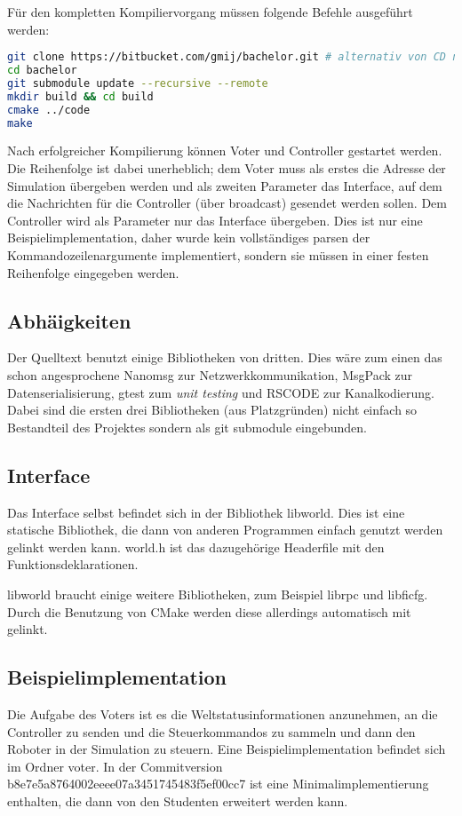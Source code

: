\documentclass[
    12pt,
    bibliography=totoc,
    ngerman,
    enabledeprecatedfontcommands
]{scrartcl}
\begin{document}
F{\"{u}}r den kompletten Kompiliervorgang m{\"{u}}ssen folgende Befehle ausgef{\"{u}}hrt werden:
\begin{lstlisting}[frame=single, language=Bash] 
git clone https://bitbucket.com/gmij/bachelor.git # alternativ von CD nehmen
cd bachelor
git submodule update --recursive --remote
mkdir build && cd build
cmake ../code
make
\end{lstlisting}

Nach erfolgreicher Kompilierung k{\"{o}}nnen Voter und Controller gestartet werden. Die Reihenfolge ist dabei unerheblich; dem Voter muss als erstes die Adresse der Simulation
{\"{u}}bergeben werden und als zweiten Parameter das Interface, auf dem die Nachrichten f{\"{u}}r die Controller ({\"{u}}ber broadcast) gesendet werden sollen. Dem Controller
wird als Parameter nur das Interface {\"{u}}bergeben. Dies ist nur eine Beispielimplementation, daher wurde kein vollst{\"{a}}ndiges parsen der Kommandozeilenargumente
implementiert, sondern sie m{\"{u}}ssen in einer festen Reihenfolge eingegeben werden.

\subsection{Abh{\"{a}}igkeiten}
Der Quelltext benutzt einige Bibliotheken von dritten. Dies w{\"{a}}re zum einen das schon angesprochene Nanomsg zur Netzwerkkommunikation, MsgPack zur Datenserialisierung,
gtest zum \textit{unit testing} und RSCODE zur Kanalkodierung. Dabei sind die ersten drei Bibliotheken (aus Platzgr{\"{u}}nden) nicht einfach so Bestandteil des Projektes
sondern als git submodule eingebunden.

\subsection{Interface}
Das Interface selbst befindet sich in der Bibliothek libworld. Dies ist eine statische Bibliothek, die dann von anderen Programmen einfach genutzt werden
gelinkt werden kann. world.h ist das dazugeh{\"{o}}rige Headerfile mit den Funktionsdeklarationen.

libworld braucht einige weitere Bibliotheken, zum Beispiel librpc und libficfg. Durch die Benutzung von CMake werden diese allerdings automatisch mit gelinkt.

\subsection{Beispielimplementation}
Die Aufgabe des Voters ist es die Weltstatusinformationen anzunehmen, an die Controller zu senden und die Steuerkommandos zu sammeln und dann den Roboter in
der Simulation zu steuern. Eine Beispielimplementation befindet sich im Ordner voter. In der Commitversion b8e7e5a8764002eeee07a3451745483f5ef00cc7 ist eine
Minimalimplementierung enthalten, die dann von den Studenten erweitert werden kann.
\end{document}
